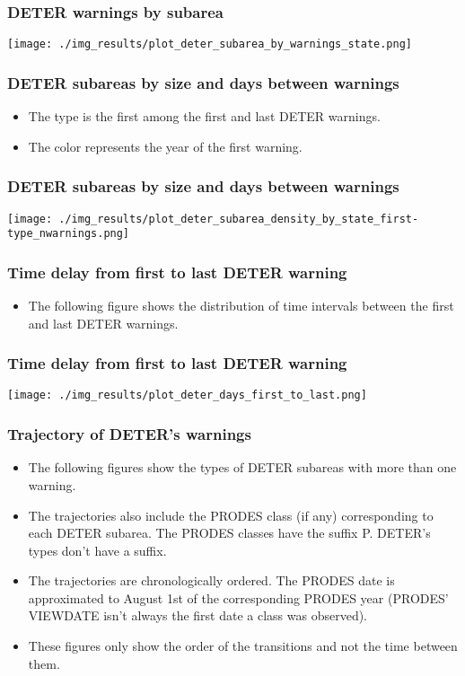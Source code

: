 \documentclass{beamer}
\begin{document}
\begin{frame}
    \frametitle{DETER warnings by subarea}
    \texttt{[image: ./img\_results/plot\_deter\_subarea\_by\_warnings\_state.png]}
\end{frame}


\begin{frame}
    \frametitle{DETER subareas by size and days between warnings}
    \begin{itemize}
        \item The type is the first among the first and last DETER warnings.
        \item The color represents the year of the first warning.
    \end{itemize}
\end{frame}

\begin{frame}
    \frametitle{DETER subareas by size and days between warnings}
    \texttt{[image: ./img\_results/plot\_deter\_subarea\_density\_by\_state\_first-type\_nwarnings.png]}
\end{frame}


\begin{frame}
    \frametitle{Time delay from first to last DETER warning}
    \begin{itemize}
        \item The following figure shows the distribution of time intervals
            between the first and last DETER warnings.
    \end{itemize}
\end{frame}

\begin{frame}
    \frametitle{Time delay from first to last DETER warning}
    \texttt{[image: ./img\_results/plot\_deter\_days\_first\_to\_last.png]}
\end{frame}


\begin{frame}
    \frametitle{Trajectory of DETER's warnings}
    \begin{itemize}
        \item The following figures show the types of DETER subareas with more
            than one warning. 
        \item The trajectories also include the PRODES class (if any) 
            corresponding to each DETER subarea. The PRODES classes have the 
            suffix P. DETER's types don't have a suffix.
        \item The trajectories are chronologically ordered. The PRODES date
            is approximated to August 1st of the corresponding PRODES year 
            (PRODES' VIEWDATE isn't always the first date a class was 
            observed).
        \item These figures only show the order of the transitions and not the
            time between them.
    \end{itemize}
\end{frame}
\end{document}
